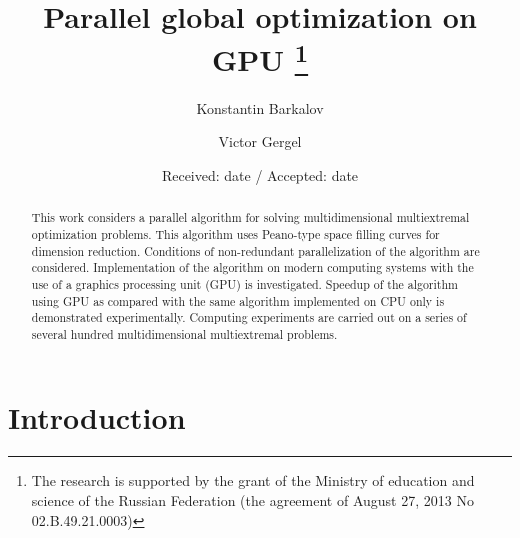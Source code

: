 \documentclass[smallcondensed]{svjour3}     %
\begin{document}
\title{Parallel global optimization on GPU 
	\thanks{The research is supported by the grant of the Ministry of education and science of the Russian Federation (the agreement of August 27, 2013 No 02.B.49.21.0003)}
}

\author{Konstantin Barkalov         \and
        Victor Gergel 
}



\date{Received: date / Accepted: date}


\maketitle

\begin{abstract}
This work considers a parallel algorithm for solving multidimensional multiextremal optimization problems. This algorithm uses Peano-type space filling curves for dimension reduction. Conditions of non-redundant parallelization of the algorithm are considered. Implementation of the algorithm on modern computing systems with the use of a graphics processing unit (GPU) is investigated. Speedup of the algorithm using GPU as compared with the same algorithm implemented on CPU only is demonstrated experimentally. Computing experiments are carried out on a series of several hundred multidimensional multiextremal problems.
\end{abstract}

\section{Introduction} \label{intro}
\end{document}
